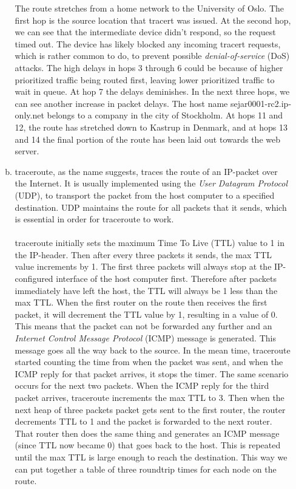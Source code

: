 \documentclass[a4paper,9pt,fleqn]{article}
\begin{document}
\begin{enumerate}[{Task} 1]
\begin{enumerate}[a)]
		The route stretches from a home network to the University of Oslo. The first hop
		is the source location that {\outp tracert} was issued. At the second hop,
		we can see that the intermediate device didn't respond, so the request timed out.
		The device has likely blocked any incoming {\outp tracert} requests, which is rather
		common to do, to prevent possible {\it denial-of-service} (DoS) attacks. The high
		delays in hops 3 through 6 could be because of higher prioritized traffic being routed
		first, leaving lower prioritized traffic to wait in queue. At hop 7 the delays deminishes.
		In the next three hops, we can see another increase in packet delays. The host name
		{\outp sejar0001-rc2.ip-only.net} belongs to a company in the city of Stockholm. At
		hops 11 and 12, the route has stretched down to Kastrup in Denmark, and at hops 13
		and 14 the final portion of the route has been laid out towards the web server.
		\\
		\item 
		{\outp traceroute}, as the name suggests, traces the route of an IP-packet over
		the Internet. It is usually implemented using the {\it User Datagram Protocol} (UDP),
		to transport the packet from the host computer to a specified destination.
		UDP maintains the route for all packets that it sends, which is essential in order for
		{\outp traceroute} to work.
		\\ \\
		{\outp traceroute} initially sets the maximum {\outp Time To Live} ({\outp TTL}) value
		to 1 in the IP-header. Then after every three packets it sends, the max {\outp TTL} value
		increments by 1. The first three packets will always stop at the IP-configured interface
		of the host computer first. Therefore after packets immediately have left the host, the
		{\outp TTL} will always be 1 less than the max {\outp TTL}. When the first router on the
		route then receives the first packet, it will decrement the {\outp TTL} value by 1, resulting
		in a value of 0. This means that the packet can not be forwarded any further and an
		{\it Internet Control Message Protocol} (ICMP) message is generated. This message goes all
		the way back to the source. In the mean time, {\outp traceroute} started counting the time
		from when the packet was sent, and when the ICMP reply for that packet arrives, it stops the
		timer. The same scenario occurs for the next two packets. When the ICMP reply for
		the third packet arrives, {\outp traceroute} increments the max {\outp TTL} to 3. Then when the
		next heap of three packets packet gets sent to the first router, the router decrements
		{\outp TTL} to 1 and the packet is forwarded to the next router. That router then does the
		same thing and generates an ICMP message (since {\outp TTL} now became 0) that goes back
		to the host. This is repeated until the max {\outp TTL} is large enough to reach the destination.
		This way we can put together a table of three roundtrip times for each node on the route.
	\end{enumerate}


\end{enumerate}
\end{document}
